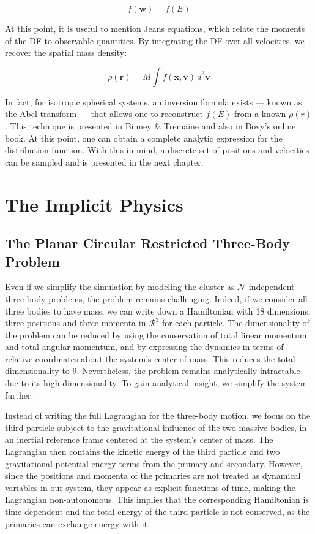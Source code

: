         \[
        f(\mathbf{w}) = f(E)
        \]

        At this point, it is useful to mention Jeans equations, which relate the moments of the DF to observable quantities. By integrating the DF over all velocities, we recover the spatial mass density:

        \[
        \rho(\mathbf{r}) = M \int f(\mathbf{x}, \mathbf{v}) \, d^3\mathbf{v}
        \]

        In fact, for isotropic spherical systems, an inversion formula exists — known as the Abel transform — that allows one to reconstruct \( f(E) \) from a known \( \rho(r) \). This technique is presented in Binney \& Tremaine and also in Bovy's online book. At this point, one can obtain a complete analytic expression for the distribution function. With this in mind, a discrete set of positions and velocities can be sampled and is presented in the next chapter.

        



\section{The Implicit Physics}

    \subsection{The Planar Circular Restricted Three-Body Problem}
        
        Even if we simplify the simulation by modeling the cluster as $\mathcal{N}$ independent three-body problems, the problem remains challenging. Indeed, if we consider all three bodies to have mass, we can write down a Hamiltonian with 18 dimensions: three positions and three momenta in $\mathcal{R}^3$ for each particle. The dimensionality of the problem can be reduced by using the conservation of total linear momentum and total angular momentum, and by expressing the dynamics in terms of relative coordinates about the system's center of mass. This reduces the total dimensionality to 9. Nevertheless, the problem remains analytically intractable due to its high dimensionality. To gain analytical insight, we simplify the system further.
        
        Instead of writing the full Lagrangian for the three-body motion, we focus on the third particle subject to the gravitational influence of the two massive bodies, in an inertial reference frame centered at the system's center of mass. The Lagrangian then contains the kinetic energy of the third particle and two gravitational potential energy terms from the primary and secondary. However, since the positions and momenta of the primaries are not treated as dynamical variables in our system, they appear as explicit functions of time, making the Lagrangian non-autonomous. This implies that the corresponding Hamiltonian is time-dependent and the total energy of the third particle is not conserved, as the primaries can exchange energy with it.


